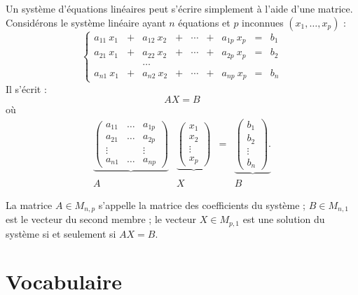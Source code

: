 \documentclass[11pt,class=report,crop=false]{standalone}
\begin{document}
Un système d'équations linéaires peut s'écrire simplement à l'aide d'une matrice.
Considérons le système linéaire ayant $n$ équations et $p$ inconnues $(x_1,\ldots,x_p)$ :
\[ \left\{
\begin{array}{ccccccccc}
	a_{11} \  x_1 &+& a_{12}\  x_2 &+& \cdots &+& a_{1p}\  x_p & = & b_1\\
	a_{21}\  x_1 &+& a_{22}\  x_2 &+& \cdots &+& a_{2p}\  x_p & = & b_2\\
	&&\dots  && &&\\
	a_{n1}\  x_1 &+& a_{n2}\  x_2 &+& \cdots &+& a_{np}\  x_p & = & b_n
\end{array} \right.
\]
Il s'écrit :
$$AX=B$$
où 
\begin{equation*}
	\begin{array}{cccc}
		\underbrace{
			\left(
			\begin{array}{ccc}
				a_{11} & \dots & a_{1p}\\
				a_{21} & \dots & a_{2p}\\
				\vdots &&\vdots\\
				a_{n1} &\dots & a_{np}
			\end{array}
			\right)
		}
		&
		\underbrace{
			\left(
			\begin{array}{c}
				x_1\\
				x_2\\
				\vdots\\
				x_p
			\end{array}
			\right)
		}
		& = &
		\underbrace{
			\left(
			\begin{array}{c}
				b_1\\
				b_2\\
				\vdots\\
				b_n
			\end{array}
			\right).
		}
		\\
		A & X & &B
\end{array}\end{equation*}

La matrice $A \in M_{n,p}$ s'appelle la matrice des coefficients du système ;
$B\in M_{n,1}$ est le vecteur du second membre ;
le vecteur $X \in M_{p,1}$ est une solution du système si et seulement si $AX = B$.



\section{Vocabulaire}
\end{document}

